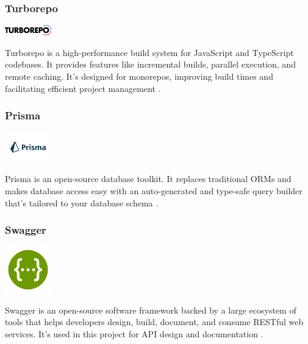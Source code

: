 \clearpage

\subsubsection*{Turborepo}
\begin{center}
\includegraphics[width=0.15\textwidth]{Images/logos/turbopack-logotype-light-background.png}
\label{fig:turborepo}
\end{center}
Turborepo is a high-performance build system for JavaScript and TypeScript codebases. It provides features like incremental builds, parallel execution, and remote caching. It’s designed for monorepos, improving build times and facilitating efficient project management \cite{turborepo}.

\subsubsection*{Prisma}
\begin{center}
\includegraphics[width=0.15\textwidth]{Images/logos/Prisma.png}
\label{fig:prisma}
\end{center}
Prisma is an open-source database toolkit. It replaces traditional ORMs and makes database access easy with an auto-generated and type-safe query builder that’s tailored to your database schema \cite{prisma}.

\subsubsection*{Swagger}
\begin{center}
\includegraphics[width=0.15\textwidth]{Images/logos/Swagger-logo.png}
\label{fig:swagger}
\end{center}
Swagger is an open-source software framework backed by a large ecosystem of tools that helps developers design, build, document, and consume RESTful web services. It’s used in this project for API design and documentation \cite{swagger}.